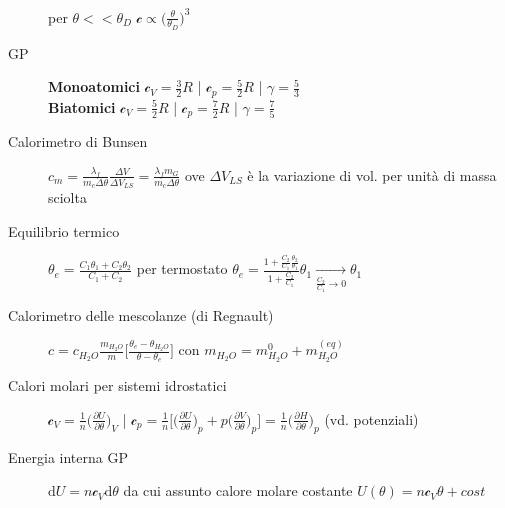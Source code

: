 \documentclass[10pt, oneside]{article}
\begin{document}
\begin{description}
\\per $\displaystyle \theta << \theta_D$ $\displaystyle \mathcal{c} \propto \big(\frac{\theta}{\theta_D}\big)^3$
\item[GP]\textbf{Monoatomici} $\displaystyle \mathcal{c}_V = \frac{3}{2}R$ | $\displaystyle \mathcal{c}_p = \frac{5}{2} R$ | $\displaystyle \gamma = \frac{5}{3}$
\\\textbf{Biatomici} 
$\displaystyle \mathcal{c}_V = \frac{5}{2}R$ | $\displaystyle \mathcal{c}_p = \frac{7}{2} R$ | $\displaystyle \gamma = \frac{7}{5}$
\item[Calorimetro di Bunsen] $\displaystyle c_m = \frac{\lambda_f}{m_c \Delta \theta} \frac{\Delta V}{\Delta V_{LS}} = \frac{\lambda_f m_G}{m_c \Delta \theta}$ ove $\Delta V_{LS}$ è la variazione di vol. per unità di massa sciolta
\item[Equilibrio termico] $\displaystyle \theta_e = \frac{C_1 \theta_1 + C_2 \theta_2}{C_1 + C_2}$ per termostato $\displaystyle \theta_e = \frac{\displaystyle 1 + \frac{C_2}{C_1} \frac{\theta_2}{\theta_1}}{\displaystyle 1 + \frac{C_2}{C_1}} \theta_1 \xrightarrow[\displaystyle \frac{C_2}{C_1} \rightarrow 0]{} \theta_1$
\item[Calorimetro delle mescolanze (di Regnault)] $\displaystyle c = c_{H_2O} \frac{m_{H_2O}}{m}\bigg[\frac{\theta_e - \theta_{H_2O}}{\theta - \theta_e}\bigg]$ con $\displaystyle m_{H_2O} = m_{H_2O}^0 + m_{H_2O}^{(eq)}$
\item[Calori molari per sistemi idrostatici]
$\displaystyle \mathcal{c}_V = \frac{1}{n} \bigg(\frac{\partial U}{\partial \theta}\bigg)_V$ \bigg| $\displaystyle \mathcal{c}_p = \frac{1}{n} \bigg[\bigg(\frac{\partial U}{\partial \theta}\bigg)_p + p \bigg(\frac{\partial V}{\partial \theta}\bigg)_p\bigg] = \frac{1}{n} \bigg(\frac{\partial H}{\partial \theta}\bigg)_p$ (vd. potenziali)
\item[Energia interna GP] $\displaystyle \mathrm{d}U = n \mathcal{c}_V \mathrm{d}\theta$ da cui assunto calore molare costante $\displaystyle U(\theta) = n \mathcal{c}_V \theta + cost$
\end{description} 
\begin{center}
\end{center}
\end{document}
